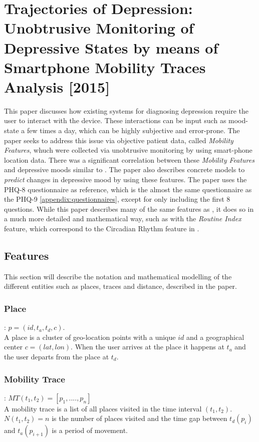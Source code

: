 \section{Trajectories of Depression: Unobtrusive Monitoring of Depressive States by means of Smartphone Mobility Traces Analysis [2015]} 
\cite{Canzian2015}
This paper discusses how existing systems for diagnosing depression require the user to interact with the device. These interactions can be input such as mood-state a few times a day, which can be highly subjective and error-prone. The paper seeks to address this issue via objective patient data, called \textit{Mobility Features}, whuch were collected via unobtrusive monitoring by using smart-phone location data. There was a significant correlation between these \textit{Mobility Features} and depressive moods similar to \cite{Saeb2015}. The paper also describes concrete models to \textit{predict} changes in depressive mood by using these features. The paper uses the PHQ-8 questionnaire as reference, which is the almost the same questionnaire as the PHQ-9 \ref{appendix:questionnaires}, except for only including the first 8 questions. While this paper describes many of the same features as \cite{Saeb2015}, it does so in a much more detailed and mathematical way, such as with the \textit{Routine Index} feature, which correspond to the Circadian Rhythm feature in \cite{Saeb2015}.

\subsection{Features}
This section will describe the notation and mathematical modelling of the different entities such as places, traces and distance, described in the paper.

\subsubsection*{Place}: $p = (id, t_a, t_d, c)$.\\ 
A place is a cluster of geo-location points with a unique $id$ and a geographical center $c = (lat, lon)$. When the user arrives at the place it happens at $t_a$ and the user departs from the place at $t_d$. \\

\subsubsection*{Mobility Trace}: $MT(t_1, t_2) = [p_1, ...., p_n]$ \\
A mobility trace is a list of all places visited in the time interval $(t_1, t_2)$. $N(t_1, t_2) = n$ is the number of places visited and the time gap between $t_d (p_i)$ and $t_a (p_{i+1})$ is a period of movement.\\

